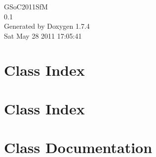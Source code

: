\documentclass[a4paper]{book}
\begin{document}
\hypersetup{pageanchor=false}
\begin{titlepage}
\vspace*{7cm}
\begin{center}
{\Large GSoC2011SfM \\[1ex]\large 0.1 }\\
\vspace*{1cm}
{\large Generated by Doxygen 1.7.4}\\
\vspace*{0.5cm}
{\small Sat May 28 2011 17:05:41}\\
\end{center}
\end{titlepage}
\clearemptydoublepage
{}
\tableofcontents
\clearemptydoublepage
{}
\hypersetup{pageanchor=true}
\chapter{Class Index}

\chapter{Class Index}

\chapter{Class Documentation}








\printindex
\end{document}
